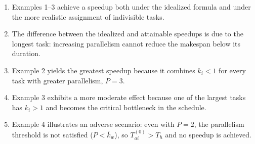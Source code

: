 \begin{remark}
\begin{enumerate}
  \item Examples 1--3 achieve a speedup both under the idealized formula and
  under the more realistic assignment of indivisible tasks.
  \item The difference between the idealized and attainable speedups is due to
  the longest task: increasing parallelism cannot reduce the makespan below
  its duration.
  \item Example 2 yields the greatest speedup because it combines $k_i < 1$
  for every task with greater parallelism, $P=3$.
  \item Example 3 exhibits a more moderate effect because one of the largest
  tasks has $k_i > 1$ and becomes the critical bottleneck in the schedule.
  \item Example 4 illustrates an adverse scenario: even with $P=2$, the
  parallelism threshold is not satisfied ($P < \bar{k}_w$), so
  $T_{ai}^{(0)} > T_h$ and no speedup is achieved.
\end{enumerate}
\end{remark}
